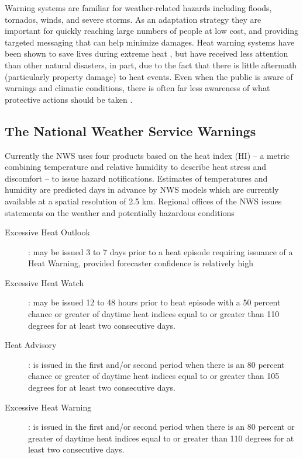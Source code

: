\documentclass{ametsoc}
\begin{document}
Warning systems are familiar for weather-related hazards including floods, tornados, winds, and severe storms. As an adaptation strategy they are important for quickly reaching large numbers of people at low cost, and providing targeted messaging that can help minimize damages. Heat warning systems have been shown to save lives during extreme heat \citep{Ebi2004}, but have received less attention than other natural disasters, in part, due to the fact that there is little aftermath (particularly property damage) to heat events. Even when the public is aware of warnings and climatic conditions, there is often far less awareness of what protective actions should be taken \citep{Sheridan2007}.  

\subsection{The National Weather Service Warnings} \label{subsec:NWSWarnings}
Currently the NWS uses four products based on the heat index (HI) -- a metric combining temperature and relative humidity to describe heat stress and discomfort -- to issue hazard notifications. Estimates of temperatures and humidity are predicted days in advance by NWS models which are currently available at a spatial resolution of 2.5 km. Regional offices of the NWS issues statements on the weather and potentially hazardous conditions 

\begin{description} 
\item[Excessive Heat Outlook]: may be issued 3 to 7 days prior to a heat episode requiring issuance of a Heat Warning, provided forecaster confidence is relatively high 
\item[Excessive Heat Watch]: may be issued 12 to 48 hours prior to heat episode with a 50 percent chance or greater of daytime heat indices equal to or greater than 110 degrees for at least two consecutive days. 
\item[Heat Advisory]: is issued in the first and/or second period when there is an 80 percent chance or greater of daytime heat indices equal to or greater than 105 degrees for at least two consecutive days. 
\item[Excessive Heat Warning]: is issued in the first and/or second period when there is an 80 percent or greater of daytime heat indices equal to or greater than 110 degrees for at least two consecutive days. 
\end{description}
\end{document}
